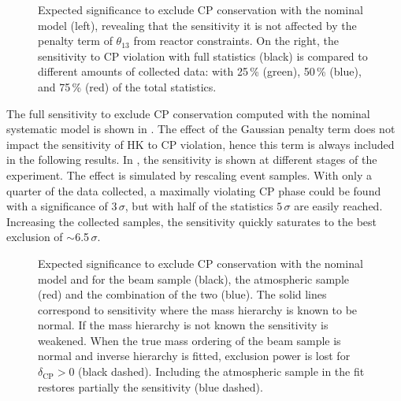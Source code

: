 \begin{figure}
	\centering
	\resizebox{0.49\linewidth}{!}{}
	\resizebox{0.49\linewidth}{!}{}
	\caption[Sensitivity to $\delta_\text{CP}$ with the nominal systematic model]%
		{Expected significance to exclude CP conservation with the nominal model (left), %
		revealing that the sensitivity it is not affected by the penalty term of $\theta_{13}$ %
		from reactor constraints.
		On the right, the sensitivity to CP violation with full statistics (black) is compared %
		to different amounts of collected data: %
		with 25\,\% (green), 50\,\% (blue), and 75\,\% (red) of the total statistics.}
	\label{fig:nominal_sensitivity}
\end{figure}


The full sensitivity to exclude CP conservation computed with the nominal systematic model %
is shown in .
The effect of the Gaussian penalty term does not impact the sensitivity of HK to CP violation, %
hence this term is always included in the following results.
In , the sensitivity is shown at different stages of the experiment.
The effect is simulated by rescaling event samples.
With only a quarter of the data collected, a maximally violating CP phase could be found with a significance of $3\,\sigma$, %
but with half of the statistics $5\,\sigma$ are easily reached.
Increasing the collected samples, the sensitivity quickly saturates to the best exclusion of $\sim$6.5\,$\sigma$.

\begin{figure}
	\centering
	\resizebox{0.7\linewidth}{!}{}
	\caption[Sensitivity to $\delta_\text{CP}$ with the nominal model and unknown hierarchy]%
		{Expected significance to exclude CP conservation with the nominal model and %
		for the beam sample (black), the atmospheric sample (red) and the combination of the two (blue).
		The solid lines correspond to sensitivity where the mass hierarchy is known to be normal.
		If the mass hierarchy is not known the sensitivity is weakened.
		When the true mass ordering of the beam sample is normal and inverse hierarchy is fitted, %
		exclusion power is lost for $\delta_\text{CP} > 0$ (black dashed).
		Including the atmospheric sample in the fit restores partially the sensitivity (blue dashed).}
	\label{fig:combined_sens}
\end{figure}


